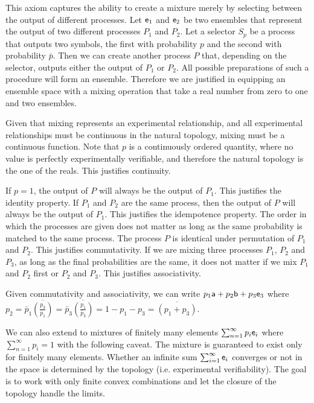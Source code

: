 \begin{justification}
	This axiom captures the ability to create a mixture merely by selecting between the output of different processes. Let $\ens_1$ and $\ens_2$ be two ensembles that represent the output of two different processes $P_1$ and $P_2$. Let a selector $S_p$ be a process that outputs two symbols, the first with probability $p$ and the second with probability $\bar{p}$. Then we can create another process $P$ that, depending on the selector, outputs either the output of $P_1$ or $P_2$. All possible preparations of such a procedure will form an ensemble. Therefore we are justified in equipping an ensemble space with a mixing operation that take a real number from zero to one and two ensembles.
	
	Given that mixing represents an experimental relationship, and all experimental relationships must be continuous in the natural topology, mixing must be a continuous function. Note that $p$ is a continuously ordered quantity, where no value is perfectly experimentally verifiable, and therefore the natural topology is the one of the reals. This justifies continuity.

	If $p=1$, the output of $P$ will always be the output of $P_1$. This justifies the identity property. If $P_1$ and $P_2$ are the same process, then the output of $P$ will always be the output of $P_1$. This justifies the idempotence property. The order in which the processes are given does not matter as long as the same probability is matched to the same process. The process $P$ is identical under permutation of $P_1$ and $P_2$. This justifies commutativity. If we are mixing three processes $P_1$, $P_2$ and $P_3$, as long as the final probabilities are the same, it does not matter if we mix $P_1$ and $P_2$ first or $P_2$ and $P_3$. This justifies associativity.
\end{justification}

\begin{remark}
	Given commutativity and associativity, we can write $p_1 \ens[a] + p_2 \ens[b] + p_3 \ens_3$ where $p_2 = \bar{p}_1\overline{\left(\frac{p_3}{\bar{p}_1}\right)} = \bar{p}_3\overline{\left(\frac{p_1}{\bar{p}_3}\right)} = 1 - p_1 - p_3 = \overline{\left(p_1 + p_3\right)}$.
	
	We can also extend to mixtures of finitely many elements $\sum_{n=1}^\infty p_i \ens_i$ where $\sum_{n=1}^\infty p_i = 1$ with the following caveat. The mixture is guaranteed to exist only for finitely many elements. Whether an infinite sum $\sum_{i=1}^\infty \ens_i$ converges or not in the space is determined by the topology (i.e. experimental verifiability). The goal is to work with only finite convex combinations and let the closure of the topology handle the limits.
\end{remark}

